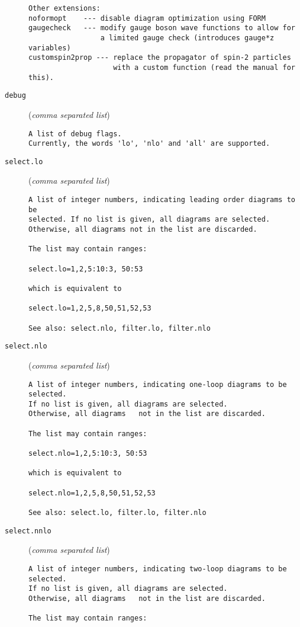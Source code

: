 \begin{description}
\begin{verbatim}
Other extensions:
noformopt    --- disable diagram optimization using FORM
gaugecheck   --- modify gauge boson wave functions to allow for
                 a limited gauge check (introduces gauge*z variables)
customspin2prop --- replace the propagator of spin-2 particles
                    with a custom function (read the manual for this).
\end{verbatim}
\item[\texttt{debug}] (\textit{comma separated list})
\begin{verbatim}
A list of debug flags.
Currently, the words 'lo', 'nlo' and 'all' are supported.
\end{verbatim}
\item[\texttt{select.lo}] (\textit{comma separated list})
\begin{verbatim}
A list of integer numbers, indicating leading order diagrams to be
selected. If no list is given, all diagrams are selected.
Otherwise, all diagrams not in the list are discarded.

The list may contain ranges:

select.lo=1,2,5:10:3, 50:53

which is equivalent to

select.lo=1,2,5,8,50,51,52,53

See also: select.nlo, filter.lo, filter.nlo
\end{verbatim}
\item[\texttt{select.nlo}] (\textit{comma separated list})
\begin{verbatim}
A list of integer numbers, indicating one-loop diagrams to be selected.
If no list is given, all diagrams are selected.
Otherwise, all diagrams   not in the list are discarded.

The list may contain ranges:

select.nlo=1,2,5:10:3, 50:53

which is equivalent to

select.nlo=1,2,5,8,50,51,52,53

See also: select.lo, filter.lo, filter.nlo
\end{verbatim}
\item[\texttt{select.nnlo}] (\textit{comma separated list})
\begin{verbatim}
A list of integer numbers, indicating two-loop diagrams to be selected.
If no list is given, all diagrams are selected.
Otherwise, all diagrams   not in the list are discarded.

The list may contain ranges:


\end{verbatim}
\end{description}
